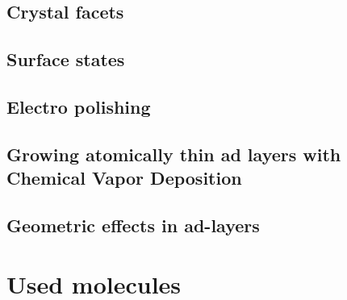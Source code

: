 \documentclass[
10pt,					%
a4paper,				%
twoside,				%
BCOR=8mm,				%
headings=normal,		%
headsepline,			%
footsepline,			%
plainfootsepline,		%
]{scrbook}
\begin{document}
     \subsection{Crystal facets}
        
     \subsection{Surface states}
		
     \subsection{Electro polishing}
    	
     \subsection{Growing atomically thin ad layers with \textbf{C}hemical \textbf{V}apor \textbf{D}eposition}
             
     \subsection{Geometric effects in ad-layers}
		
  \section{Used molecules}
    
%
%
\end{document}
